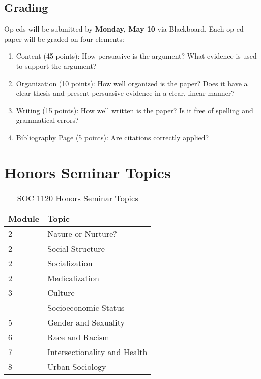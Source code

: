 \documentclass[
]{book}
\providecommand{\tightlist}{%
  \setlength{\itemsep}{0pt}\setlength{\parskip}{0pt}}
\begin{document}
\hypertarget{grading-2}{%
\subsection{Grading}\label{grading-2}}

Op-eds will be submitted by \textbf{Monday, May 10} via Blackboard. Each op-ed paper will be graded on four elements:

\begin{enumerate}
\def\labelenumi{\arabic{enumi}.}
\tightlist
\item
  Content (45 points): How persuasive is the argument? What evidence is used to support the argument?
\item
  Organization (10 points): How well organized is the paper? Does it
  have a clear thesis and present persuasive evidence in a clear, linear manner?
\item
  Writing (15 points): How well written is the paper? Is it free of
  spelling and grammatical errors?
\item
  Bibliography Page (5 points): Are citations correctly applied?
\end{enumerate}

\hypertarget{honors-seminar-topics}{%
\section{Honors Seminar Topics}\label{honors-seminar-topics}}

\begin{table}

\caption{\label{tab:unnamed-chunk-4}SOC 1120 Honors Seminar Topics}
\centering
\begin{tabular}[t]{ll}
\toprule
Module & Topic\\
\midrule
2 & Nature or Nurture?\\
2 & Social Structure\\
2 & Socialization\\
2 & Medicalization\\
3 & Culture\\
\addlinespace
4 & Socioeconomic Status\\
5 & Gender and Sexuality\\
6 & Race and Racism\\
7 & Intersectionality and Health\\
8 & Urban Sociology\\
\bottomrule
\end{tabular}
\end{table}
\end{document}
